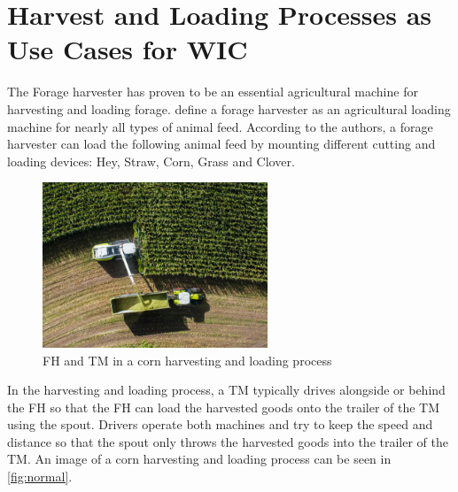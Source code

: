 \section[Use Cases for \acl{WIC}]{Harvest and Loading Processes as Use Cases for \acl{WIC}}
The Forage harvester has proven to be an essential agricultural machine for harvesting and loading forage. \textcite{seifert_feldhacksler_1962} define a forage harvester
as an agricultural loading machine for nearly all types of animal feed. According to the authors, a forage harvester can load the following animal feed by mounting different cutting and loading devices: Hey, Straw, Corn, Grass and Clover.
\begin{figure}%
	\centering
	\includegraphics[width=0.6\textwidth]{figures/claas_harvest_side.png}
	\caption{\acf{FH} and \acf{TM} in a corn harvesting and loading process}%
	\label{fig:normal}%
\end{figure}

In the harvesting and loading process, a \ac{TM} typically drives alongside or behind the \ac{FH} so that the \ac{FH} can load the harvested goods onto the trailer of the \ac{TM} using the spout. Drivers operate both machines and try to keep the speed and distance so that the spout only throws the harvested goods into the trailer of the TM. An image of a corn harvesting and loading process can be seen in \autoref{fig:normal}.

